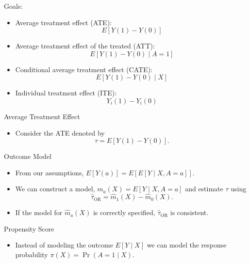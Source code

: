 \documentclass[handout]{beamer} %
\begin{document}
\begin{frame}{Goals:}

\begin{itemize}
    \item Average treatment effect (ATE): 
    \[E[Y(1) - Y(0)]\]
    \item Average treatment effect of the treated (ATT): 
    \[E[Y(1) - Y(0) \mid A = 1]\]
    \item Conditional average treatment effect (CATE):
    \[E[Y(1) - Y(0) \mid X]\]
    \item Individual treatment effect (ITE): 
    \[Y_i(1) - Y_i(0)\]
\end{itemize}

\end{frame}

\begin{frame}{Average Treatment Effect}

\begin{itemize}
    \item Consider the ATE denoted by 
    \[\tau = E[Y(1) - Y(0)].\]
\end{itemize}
    
\end{frame}

\begin{frame}{Outcome Model}

\begin{itemize}
    \item From our assumptions, $E[Y(a)] = E[E[Y \mid X, A = a]]$.
    \item We can construct a model, $m_a(X) = E[Y \mid X, A = a]$ and estimate $\tau$
    using
    \[\hat \tau_{\text{OR}} = \hat m_1(X) - \hat m_0(X).\]
    \item If the model for $\hat m_a(X)$ is correctly specified, $\hat \tau_{\text{OR}}$
    is consistent.
\end{itemize}

\end{frame}

\begin{frame}{Propensity Score}

\begin{itemize}
    \item Instead of modeling the outcome $E[Y \mid X]$ we can model the 
    response probability $\pi(X) = \Pr(A = 1 \mid X)$.
\end{itemize}

\end{frame}
\end{document}
